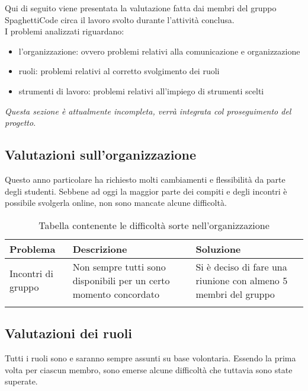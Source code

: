 \documentclass[../piano_di_qualifica.tex]{subfiles}
\begin{document}
Qui di seguito viene presentata la valutazione fatta dai membri del gruppo SpaghettiCode circa il lavoro svolto durante l'attività conclusa.\\
I problemi analizzati riguardano:
\begin{itemize}
    \item l'organizzazione: ovvero problemi relativi alla comunicazione e organizzazione
    \item ruoli: problemi relativi al corretto svolgimento dei ruoli
    \item strumenti di lavoro: problemi relativi all'impiego di strumenti scelti
\end{itemize}

\emph{Questa sezione è attualmente incompleta, verrà integrata col proseguimento del progetto}.

\subsection{Valutazioni sull'organizzazione}
\label{sub:valut_org}
Questo anno particolare ha richiesto molti cambiamenti e flessibilità da parte degli studenti. Sebbene ad oggi la maggior parte dei compiti e 
degli incontri è possibile svolgerla online, non sono mancate alcune difficoltà.

\begin{center}
\begin{longtable}{|p{3cm}|p{4.5cm}|p{4.5cm}|}
		\hline
		\rowcolor{lightgray}
            \textbf{Problema} & \textbf{Descrizione} &  \textbf{Soluzione} \\ 
            \hline 
            Incontri di gruppo & 
            Non sempre tutti sono disponibili per un certo momento concordato &
            Si è deciso di fare una riunione con almeno 5 membri del gruppo \\
            \hline
\caption{Tabella contenente le difficoltà sorte nell'organizzazione}
\end{longtable}
\end{center}


\subsection{Valutazioni dei ruoli}
\label{sub:valut_ruoli}
Tutti i ruoli sono e saranno sempre assunti su base volontaria. Essendo la prima volta per ciascun membro, sono emerse alcune difficoltà che tuttavia sono state superate.\par
\end{document}
